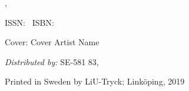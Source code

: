 


\thispagestyle{empty}

\hfill\vfill
\noindent\textcopyright\myName,~\myTime
\newline
\noindent\textit{\myTitle} %
\newline

\noindent ISSN:~ 
\newline
\noindent ISBN:~ 
\newline


\noindent Cover: Cover Artist Name
\newline

\noindent \emph{Distributed by:} \newline
\noindent \myFaculty \newline
\noindent \myDepartment \newline
\noindent \myUni \newline
\noindent SE-581 83, \myLocation \newline

 
\bigskip
\noindent Printed in Sweden by LiU-Tryck; Link\"{o}ping, 2019
\medskip